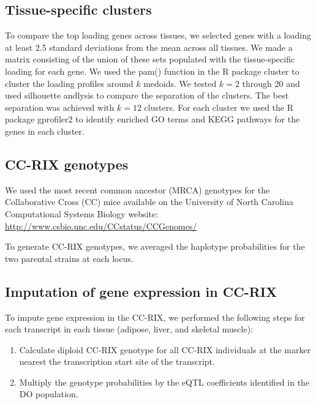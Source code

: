 \documentclass[
]{article}
\providecommand{\tightlist}{%
  \setlength{\itemsep}{0pt}\setlength{\parskip}{0pt}}
\begin{document}
\subsection{Tissue-specific clusters}\label{tissue-specific-clusters}

To compare the top loading genes across tissues, we selected genes with
a loading at least 2.5 standard deviations from the mean across all
tissues. We made a matrix consisting of the union of these sets
populated with the tissue-specific loading for each gene. We used the
pam() function in the R package cluster \cite{Rcluster} to cluster the
loading profiles around \(k\) medoids. We tested \(k = 2\) through 20
and used silhouette andlysis to compare the separation of the clusters.
The best separation was achieved with \(k = 12\) clusters. For each
cluster we used the R package gprofiler2 \cite{Rgprofiler2} to identify
enriched GO terms and KEGG pathways for the genes in each cluster.

\subsection{CC-RIX genotypes}\label{cc-rix-genotypes}

We used the most recent common ancestor (MRCA) genotypes for the
Collaborative Cross (CC) mice available on the University of North
Carolina Computational Systems Biology website:
\url{http://www.csbio.unc.edu/CCstatus/CCGenomes/}

To generate CC-RIX genotypes, we averaged the haplotype probabilities
for the two parental strains at each locus.

\subsection{Imputation of gene expression in
CC-RIX}\label{imputation-of-gene-expression-in-cc-rix}

To impute gene expression in the CC-RIX, we performed the following
steps for each transcript in each tissue (adipose, liver, and skeletal
muscle):

\begin{enumerate}
\def\labelenumi{\arabic{enumi}.}
\tightlist
\item
  Calculate diploid CC-RIX genotype for all CC-RIX individuals at the
  marker nearest the transcription start site of the transcript.
\item
  Multiply the genotype probabilities by the eQTL coefficients
  identified in the DO population.
\end{enumerate}
\end{document}
